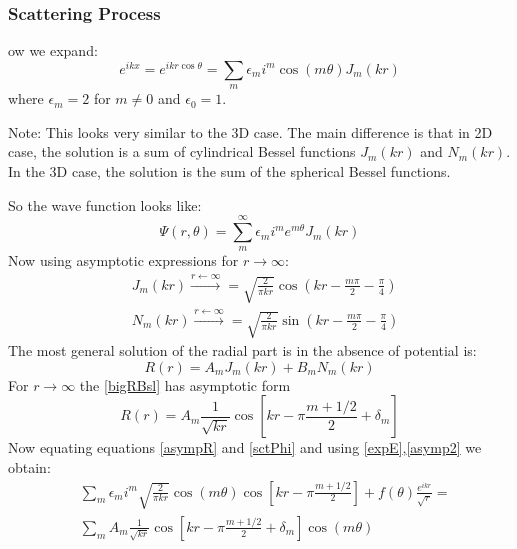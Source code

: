 \subsubsection{Scattering Process}

ow we expand:
\begin{equation}\label{expE}
e^{ikx} = e^{ikr\cos\theta} = \sum_m{\epsilon_m i^m \cos(m\theta)J_m(kr)}
\end{equation}
where $\epsilon_m = 2 $ for $ m \neq 0 $ and $ \epsilon_0 = 1 $.

Note: This looks very similar to the 3D case. The main difference is that in 2D case, the solution is a sum of cylindrical Bessel functions $ J_m(kr) $ and $ N_m(kr) $.
In the 3D case, the solution is the sum of the spherical Bessel functions.

So the wave function looks like:
\begin{equation}
    \Psi(r,\theta) = \sum_m^{\infty}{\epsilon_m i^m e^{m\theta}J_m(kr)}
\end{equation}
Now using asymptotic expressions for $ r \rightarrow \infty $:
\begin{equation}\label{}
\begin{split}
& J_m(kr) \xrightarrow{r \leftarrow \infty}  = \sqrt{\frac{2}{\pi k r}}\cos\left(kr - \frac{m\pi}{2} - \frac{\pi}{4}\right) \\[.7em]
& N_m(kr) \xrightarrow{r \leftarrow \infty}  = \sqrt{\frac{2}{\pi k r}}\sin\left(kr - \frac{m\pi}{2} - \frac{\pi}{4}\right)
\end{split}
\end{equation}
The most general solution of the radial part is in the absence of potential is:
\begin{equation}\label{bigRBsl}
R(r) = A_mJ_m(kr) + B_mN_m(kr) 
\end{equation}
For $ r \rightarrow\infty $ the \eqref{bigRBsl} has asymptotic form
\begin{equation}\label{asympR}
R(r) = A_m\frac{1}{\sqrt{kr}}\cos\left[kr-\pi\frac{m + 1/2}{2} + \delta_m\right]
\end{equation}
Now equating equations \eqref{asympR} and \eqref{sctPhi} and using \eqref{expE},\eqref{asymp2} we obtain:
\begin{equation}\label{asymR2}
\begin{split}
& \sum_m{\epsilon_m i^m\sqrt{\frac{2}{\pi kr}}\cos(m\theta)\cos\left[kr-\pi\frac{m + 1/2}{2}\right]} + f(\theta)\frac{e^{ikr}}{\sqrt{r}} = \\[.7em]
& \sum_m{A_m\frac{1}{\sqrt{kr}}\cos\left[kr-\pi\frac{m + 1/2}{2} + \delta_m\right]\cos(m\theta)}
\end{split}
\end{equation}
